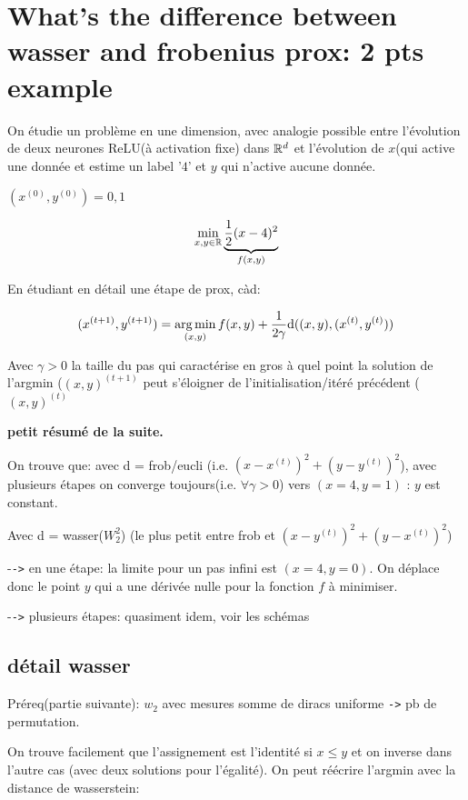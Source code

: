 \section{What's the difference between wasser and frobenius prox: 2 pts example}

On étudie un problème en une dimension, avec analogie possible entre l'évolution de deux neurones ReLU(à activation fixe) dans $\mathbb{R}^d$ et l'évolution de $x$(qui active une donnée et estime un label '$4$' et $y$ qui n'active aucune donnée.

$(x^{(0)}, y^{(0)}) = 0, 1$

\begin{equation}
	\min_{x,y \in \mathbb{R}} \underbrace{\frac{1}{2}(x - 4)^2}_{f(x, y)}
\end{equation}

En étudiant en détail une étape de prox, càd:

\begin{equation}
	(x^{(t+1)}, y^{(t+1)}) = \operatorname*{arg\,min}_{(x, y)} f(x, y) + \frac{1}{2 \gamma} \mathrm{d}((x,y),(x^{(t)}, y^{(t)}))
\end{equation}

Avec $\gamma > 0$ la taille du pas qui caractérise en gros à quel point la solution de l'argmin ($(x,y)^{(t+1)}$ peut s'éloigner de l'initialisation/itéré précédent ($(x,y)^{(t)}$

\textbf{petit résumé de la suite.}

On trouve que: avec d = frob/eucli (i.e. $(x-x^{(t)})^2 + (y-y^{(t)})^2$), avec plusieurs étapes on converge toujours(i.e. $\forall \gamma > 0$) vers $(x=4, y=1)$ : $y$ est constant.

Avec d = wasser($W^2_2$) (le plus petit entre frob et $(x-y^{(t)})^2 + (y-x^{(t)})^2$)

-\verb|->| en une étape: la limite pour un pas infini est $(x=4, y=0)$. On déplace donc le point $y$ qui a une dérivée nulle pour la fonction $f$ à minimiser.

-\verb|->| plusieurs étapes: quasiment idem, voir les schémas

\subsection{détail wasser}

Préreq(partie suivante): $w_2$ avec mesures somme de diracs uniforme \verb|->| pb de permutation.

On trouve facilement que l'assignement est l'identité si $x \leq  y$ et on inverse dans l'autre cas (avec deux solutions pour l'égalité). On peut réécrire l'argmin avec la distance de wasserstein:

